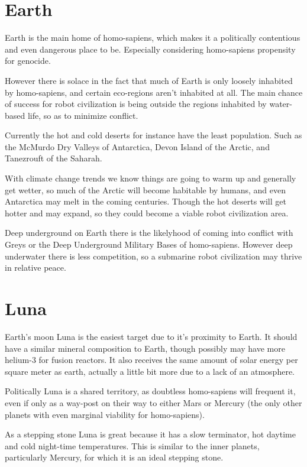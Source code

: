 \section{Earth}

Earth is the main home of homo-sapiens, which makes it a politically
contentious and even dangerous place to be. Especially considering homo-sapiens
propensity for genocide.

However there is solace in the fact that much of Earth is only loosely inhabited
by homo-sapiens, and certain eco-regions aren't inhabited at all. The main
chance of success for robot civilization is being outside the regions inhabited
by water-based life, so as to minimize conflict. 

Currently the hot and cold deserts for instance have the least population. Such
as the McMurdo Dry Valleys of Antarctica,  Devon Island of the Arctic, and
Tanezrouft of the Saharah.  

With climate change trends we know things are going to warm up and generally get
wetter, so much of the Arctic will become habitable by humans, and even
Antarctica may melt in the coming centuries. Though the hot deserts will get
hotter and may expand, so they could become a viable robot civilization area. 

Deep underground on Earth there is the likelyhood of coming into conflict with 
Greys or the Deep Underground Military Bases of homo-sapiens.   However deep
underwater there is less competition, so a submarine robot civilization may
thrive in relative peace. 

\section{Luna}

Earth's moon Luna is the easiest target due to it's proximity to Earth. It
should have a similar mineral composition to Earth, though possibly may have
more helium-3 for fusion reactors. It also receives the same amount of solar 
energy per square meter as earth, actually a little bit more due to a lack of an
atmosphere. 

Politically Luna is a shared territory, as doubtless homo-sapiens will frequent
it, even if only as a way-post on their way to either Mars or Mercury (the only
other planets with even marginal viability for homo-sapiens). 

As a stepping stone Luna is great because it has a slow terminator, hot daytime
and cold night-time temperatures. This is similar to the inner planets,
particularly Mercury, for which it is an ideal stepping stone. 

